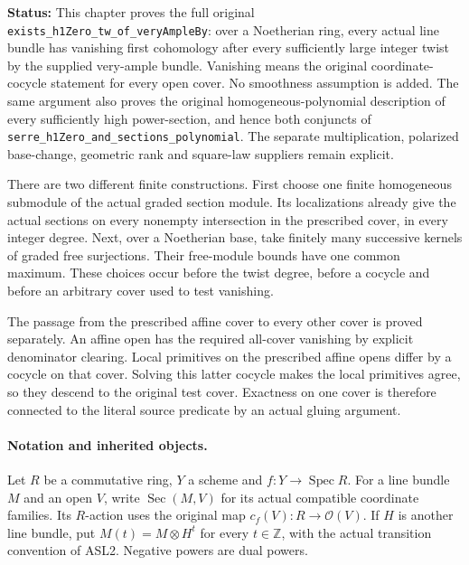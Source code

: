 \documentclass[11pt,a4paper]{article}
\numberwithin{equation}{section}
\theoremstyle{remark}\newtheorem{remark}[theorem]{Remark}
\newcommand{\status}[1]{\textbf{Status:} #1}
\begin{document}
\status{This chapter proves the full original
\texttt{exists\_\allowbreak h1Zero\_\allowbreak tw\_\allowbreak of\_\allowbreak very\allowbreak Ample\allowbreak By}:
over a Noetherian ring, every actual line bundle has vanishing first
cohomology after every sufficiently large integer twist by the supplied
very-ample bundle.  Vanishing means the original coordinate-cocycle
statement for every open cover.  No smoothness assumption is added.
The same argument also proves the original homogeneous-polynomial
description of every sufficiently high power-section, and hence both
conjuncts of \texttt{serre\_\allowbreak h1Zero\_\allowbreak and\_\allowbreak sections\_\allowbreak polynomial}.
The separate multiplication, polarized base-change, geometric rank and
square-law suppliers remain explicit.}

There are two different finite constructions.  First choose one finite
homogeneous submodule of the actual graded section module.  Its
localizations already give the actual sections on every nonempty
intersection in the prescribed cover, in every integer degree.  Next,
over a Noetherian base, take finitely many successive kernels of graded
free surjections.  Their free-module bounds have one common maximum.
These choices occur before the twist degree, before a cocycle and before
an arbitrary cover used to test vanishing.

The passage from the prescribed affine cover to every other cover is
proved separately.  An affine open has the required all-cover vanishing
by explicit denominator clearing.  Local primitives on the prescribed
affine opens differ by a cocycle on that cover.  Solving this latter
cocycle makes the local primitives agree, so they descend to the original
test cover.  Exactness on one cover is therefore connected to the literal
source predicate by an actual gluing argument.

\paragraph{Notation and inherited objects.}
Let $R$ be a commutative ring, $Y$ a scheme and
$f:Y\to\operatorname{Spec}R$.  For a line bundle $M$ and an open $V$,
write $\operatorname{Sec}(M,V)$ for its actual compatible coordinate
families.  Its $R$-action uses the original map
$c_f(V):R\to\mathcal O(V)$.  If $H$ is another line bundle, put
$M(t)=M\otimes H^t$ for every $t\in\mathbb Z$, with the actual
transition convention of ASL2.  Negative powers are dual powers.
\end{document}
